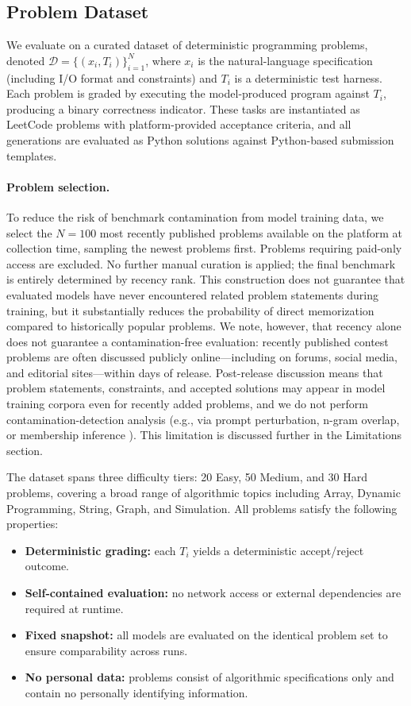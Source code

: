\documentclass[11pt]{article}
\begin{document}
\subsection{Problem Dataset}
We evaluate on a curated dataset of deterministic programming problems, denoted $\mathcal{D}=\{(x_i, T_i)\}_{i=1}^{N}$, where $x_i$ is the natural-language specification (including I/O format and constraints) and $T_i$ is a deterministic test harness. Each problem is graded by executing the model-produced program against $T_i$, producing a binary correctness indicator. These tasks are instantiated as LeetCode problems with platform-provided acceptance criteria, and all generations are evaluated as Python solutions against Python-based submission templates.

\paragraph{Problem selection.} To reduce the risk of benchmark contamination from model training data, we select the $N=100$ most recently published problems available on the platform at collection time, sampling the newest problems first. Problems requiring paid-only access are excluded. No further manual curation is applied; the final benchmark is entirely determined by recency rank. This construction does not guarantee that evaluated models have never encountered related problem statements during training, but it substantially reduces the probability of direct memorization compared to historically popular problems. We note, however, that recency alone does not guarantee a contamination-free evaluation: recently published contest problems are often discussed publicly online---including on forums, social media, and editorial sites---within days of release. Post-release discussion means that problem statements, constraints, and accepted solutions may appear in model training corpora even for recently added problems, and we do not perform contamination-detection analysis (e.g., via prompt perturbation, n-gram overlap, or membership inference \cite{deng2023investigating}). This limitation is discussed further in the Limitations section.

The dataset spans three difficulty tiers: 20 Easy, 50 Medium, and 30 Hard problems, covering a broad range of algorithmic topics including Array, Dynamic Programming, String, Graph, and Simulation. All problems satisfy the following properties:
\begin{itemize}
  \item \textbf{Deterministic grading:} each $T_i$ yields a deterministic accept/reject outcome.
  \item \textbf{Self-contained evaluation:} no network access or external dependencies are required at runtime.
  \item \textbf{Fixed snapshot:} all models are evaluated on the identical problem set to ensure comparability across runs.
  \item \textbf{No personal data:} problems consist of algorithmic specifications only and contain no personally identifying information.
\end{itemize}
\end{document}
